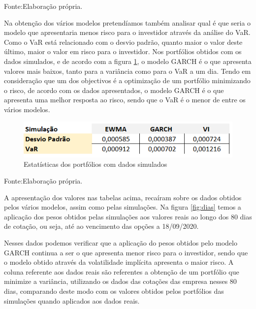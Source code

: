 \documentclass[
  12pt,
  a4paper,
  openany]{book}
\begin{document}
Fonte:Elaboração própria.

\justifying
\bigskip

Na obtenção dos vários modelos pretendíamos também analisar qual é que seria o modelo que apresentaria menos risco para o investidor através da análise do VaR. Como o VaR está relacionado com o desvio padrão, quanto maior o valor deste último, maior o valor em risco para o investidor. Nos portfólios obtidos com os dados simulados, e de acordo com a figura \ref{fig:umsim}, o modelo GARCH é o que apresenta valores mais baixos, tanto para a variância como para o VaR a um dia. Tendo em consideração que um dos objectivos é a optimização de um portfólio minimizando o risco, de acordo com os dados apresentados, o modelo GARCH é o que apresenta uma melhor resposta ao risco, sendo que o VaR é o menor de entre os vários modelos.

\begin{figure}

{\centering \includegraphics[width=0.8\linewidth]{image/simulação} 

}

\caption{Estatísticas dos portfólios com dados simulados}\label{fig:umsim}
\end{figure}
\FloatBarrier
\centering

Fonte:Elaboração própria.

\justifying
\bigskip

A apresentação dos valores nas tabelas acima, recaíram sobre os dados obtidos pelos vários modelos, assim como pelas simulações. Na figura \ref{fig:dias} temos a aplicação dos pesos obtidos pelas simulações aos valores reais ao longo dos 80 dias de cotação, ou seja, até ao vencimento das opções a 18/09/2020.

Nesses dados podemos verificar que a aplicação do pesos obtidos pelo modelo GARCH continua a ser o que apresenta menor risco para o investidor, sendo que o modelo obtido através da volatilidade implícita apresenta o maior risco. A coluna referente aos dados reais são referentes a obtenção de um portfólio que minimize a variância, utilizando os dados das cotações das empresa nesses 80 dias, comparando deste modo com os valores obtidos pelos portfólios das simulações quando aplicados aos dados reais.
\end{document}
